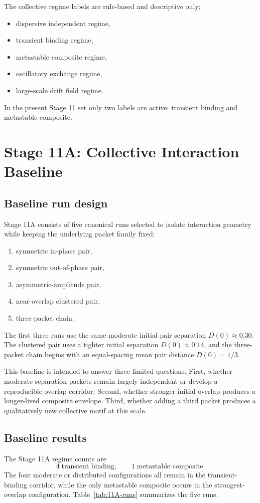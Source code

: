 \documentclass[11pt]{article}
\begin{document}
The collective regime labels are rule-based and descriptive only:
\begin{itemize}
\item dispersive independent regime,
\item transient binding regime,
\item metastable composite regime,
\item oscillatory exchange regime,
\item large-scale drift field regime.
\end{itemize}
In the present Stage 11 set only two labels are active: transient binding and metastable composite.

\section{Stage 11A: Collective Interaction Baseline}
\subsection{Baseline run design}
Stage 11A consists of five canonical runs selected to isolate interaction geometry while keeping the underlying packet family fixed:
\begin{enumerate}
\item symmetric in-phase pair,
\item symmetric out-of-phase pair,
\item asymmetric-amplitude pair,
\item near-overlap clustered pair,
\item three-packet chain.
\end{enumerate}
The first three runs use the same moderate initial pair separation $D(0)\approx 0.30$. The clustered pair uses a tighter initial separation $D(0)\approx 0.14$, and the three-packet chain begins with an equal-spacing mean pair distance $D(0)=1/3$.

This baseline is intended to answer three limited questions. First, whether moderate-separation packets remain largely independent or develop a reproducible overlap corridor. Second, whether stronger initial overlap produces a longer-lived composite envelope. Third, whether adding a third packet produces a qualitatively new collective motif at this scale.

\subsection{Baseline results}
The Stage 11A regime counts are
\begin{equation}
4\;\text{transient binding},\qquad 1\;\text{metastable composite}.
\end{equation}
The four moderate or distributed configurations all remain in the transient-binding corridor, while the only metastable composite occurs in the strongest-overlap configuration. Table~\ref{tab:11A-runs} summarizes the five runs.
\end{document}
